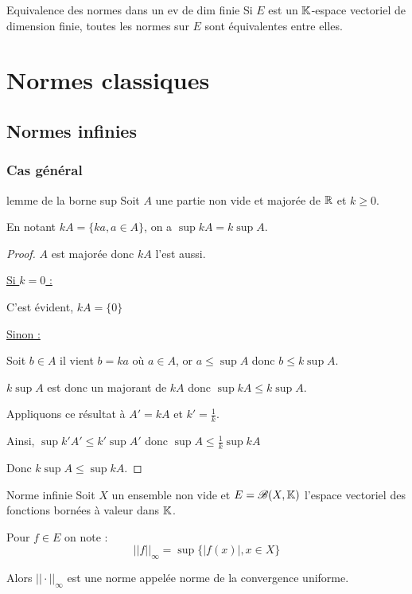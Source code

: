 \begin{theoreme}{Equivalence des normes dans un ev de dim finie}{}
    Si $E$ est un $\mathbb{K}$-espace vectoriel de dimension finie, toutes les normes 
    sur $E$ sont équivalentes entre elles.
\end{theoreme}

\section{Normes classiques}

\subsection{Normes infinies}

\subsubsection{Cas général}

\begin{theoreme}{lemme de la borne sup}{}
    Soit $A$ une partie non vide et majorée de $\mathbb{R}$ et $k \geqslant 0$. 
    
    En notant $kA = \{ka, a \in A \}$, on a $\sup kA = k \sup A$.
\end{theoreme}

\begin{proof}
    $A$ est majorée donc $kA$ l'est aussi. 

    \quad \underline{Si $k = 0$ :}

    C'est évident, $kA = \{0\}$

    \quad \underline{Sinon : }

    Soit $b \in A$ il vient $b = ka$ où $a \in A$, or $a \leqslant \sup A$ donc 
    $b \leqslant k \sup A$. 

    $k \sup A$ est donc un majorant de $k A$ donc $\sup k A \leqslant k \sup A$. 

    Appliquons ce résultat à $A' = kA$ et $k' = \frac 1 k$. 

    Ainsi, $\sup k' A' \leqslant k' \sup A'$ donc $\sup A \leqslant \frac 1 k \sup k A$

    Donc $k \sup A \leqslant \sup k A$. 
\end{proof}

\begin{proposition}{Norme infinie}{}
    Soit $X$ un ensemble non vide et $E = \mathscr B(X, \mathbb{K})$ l'espace vectoriel  des 
    fonctions bornées à valeur dans $\mathbb{K}$. 

    Pour $f \in E$ on note : 
    $$||f||_\infty = \sup \{\mid f(x) \mid, x \in X\}$$

    Alors $|| \cdot ||_\infty$ est une norme appelée norme de la convergence uniforme. 
\end{proposition}

